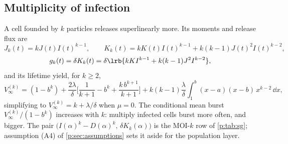 \subsection{Multiplicity of infection}

A cell founded by $k$ particles releases superlinearly more. Its moments and
release flux are
\begin{equation}
J_k(t)=kJ(t)I(t)^{k-1},\qquad
K_k(t)=kK(t)I(t)^{k-1}+k(k-1)J(t)^2I(t)^{k-2},
\label{p:eq:JkKk}
\end{equation}
\begin{equation}
g_k(t)=\delta K_k(t)
=\delta\lrb{kK I^{k-1}+k(k-1)J^2I^{k-2}},
\label{p:eq:gk}
\end{equation}
and its lifetime yield, for $k\ge2$,
\begin{equation}
V_\infty^{(k)}
=(1-b^k)
+\frac{2\lambda}{\delta}\Biggl[\frac{1}{k+1}-b^k+\frac{k\,b^{k+1}}{k+1}\Biggr]
+k(k-1)\frac{\lambda}{\delta}\int_1^b (x-a)(x-b)\,x^{k-2}\,\dd x,
\label{p:eq:Vk}
\end{equation}
simplifying to $V_\infty^{(k)}=k+\lambda/\delta$ when $\mu=0$. The
conditional mean burst $V_\infty^{(k)}/(1-b^k)$ increases with $k$: multiply
infected cells burst more often, and bigger. The pair
$\bigl(I(\alpha)^k-D(\alpha)^k,\,\delta K_k(\alpha)\bigr)$ is the MOI-$k$
row of \cref{p:tab:sg}; assumption (A4) of \cref{p:sec:assumptions} sets it
aside for the population layer.

\FloatBarrier
